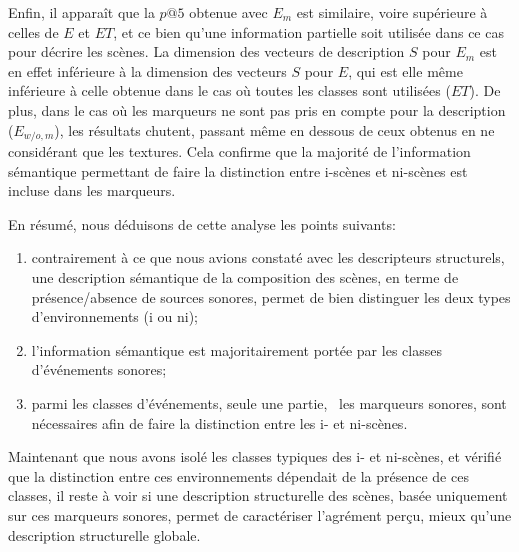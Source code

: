 Enfin, il apparaît que la $p@5$ obtenue avec $E_{m}$ est similaire, voire supérieure à celles de $E$ et $ET$, et ce bien qu'une information partielle soit utilisée dans ce cas pour décrire les scènes. La dimension des vecteurs de description $S$ pour $E_m$ est en effet inférieure à la dimension des vecteurs $S$ pour $E$, qui est elle même inférieure à celle obtenue dans le cas où toutes les classes sont utilisées ($ET$). De plus, dans le cas où les marqueurs ne sont pas pris en compte pour la description ($E_{w/o,m}$), les résultats chutent, passant même en dessous de ceux obtenus en ne considérant que les textures. Cela confirme que la majorité de l'information sémantique permettant de faire la distinction entre i-scènes et ni-scènes est incluse dans les marqueurs.

En résumé, nous déduisons de cette analyse les points suivants:

\begin{enumerate}
\item contrairement à ce que nous avions constaté avec les descripteurs structurels, une description sémantique de la composition des scènes, en terme de présence/absence de sources sonores, permet de bien distinguer les deux types d'environnements (i ou ni);
\item l'information sémantique est majoritairement portée par les classes d'événements sonores;
\item parmi les classes d'événements, seule une partie, \ie~les marqueurs sonores, sont nécessaires afin de faire la distinction entre les i- et ni-scènes.
\end{enumerate}

Maintenant que nous avons isolé les classes typiques des i- et ni-scènes, et vérifié que la distinction entre ces environnements dépendait de la présence de ces classes, il reste à voir si une description structurelle des scènes, basée uniquement sur ces marqueurs sonores, permet de caractériser l'agrément perçu, mieux qu'une description structurelle globale. 

